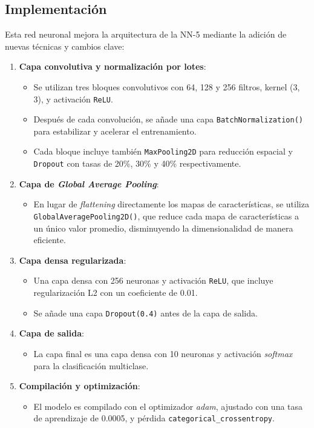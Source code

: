 \subsection{Implementación}

Esta red neuronal mejora la arquitectura de la NN-5 mediante la adición de nuevas técnicas y cambios clave:

\begin{enumerate}
	\item \textbf{Capa convolutiva y normalización por lotes}:
	\begin{itemize}
		\item Se utilizan tres bloques convolutivos con 64, 128 y 256 filtros, kernel (3, 3), y activación \texttt{ReLU}.
		\item Después de cada convolución, se añade una capa \texttt{BatchNormalization()} para estabilizar y acelerar el entrenamiento.
		\item Cada bloque incluye también \texttt{MaxPooling2D} para reducción espacial y \texttt{Dropout} con tasas de 20\%, 30\% y 40\% respectivamente.
	\end{itemize}
	
	\item \textbf{Capa de \textit{Global Average Pooling}}:
	\begin{itemize}
		\item En lugar de \textit{flattening} directamente los mapas de características, se utiliza \texttt{GlobalAveragePooling2D()}, que reduce cada mapa de características a un único valor promedio, disminuyendo la dimensionalidad de manera eficiente.
	\end{itemize}
	
	\item \textbf{Capa densa regularizada}:
	\begin{itemize}
		\item Una capa densa con 256 neuronas y activación \texttt{ReLU}, que incluye regularización L2 con un coeficiente de 0.01.
		\item Se añade una capa \texttt{Dropout(0.4)} antes de la capa de salida.
	\end{itemize}
	
	\item \textbf{Capa de salida}:
	\begin{itemize}
		\item La capa final es una capa densa con 10 neuronas y activación \textit{softmax} para la clasificación multiclase.
	\end{itemize}
	
	\item \textbf{Compilación y optimización}:
	\begin{itemize}
		\item El modelo es compilado con el optimizador \textit{adam}, ajustado con una tasa de aprendizaje de 0.0005, y pérdida \texttt{categorical\_crossentropy}.
	\end{itemize}
\end{enumerate}

